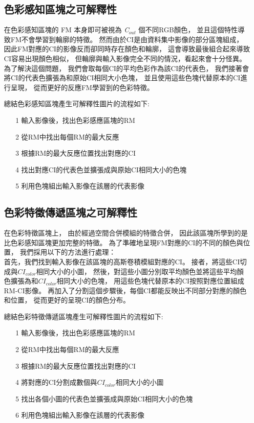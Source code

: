 \documentclass[class=NCU_thesis, crop=false]{standalone}
\begin{document}
	\subsection{色彩感知區塊之可解釋性}
	在色彩感知區塊的 FM 本身即可被視為 \textit{C}$_{out}$ 個不同RGB顏色，
	並且這個特性導致FM不會學習到輪廓的特徵。
	然而由於CI是由資料集中影像的部分區塊組成，
	因此FM對應的CI的影像反而卻同時存在顏色和輪廓，
	這會導致最後組合起來導致CI容易出現顏色相似，
	但輪廓與輸入影像完全不同的情況，看起來會十分怪異。
	為了解決這個問題，
	我們會取每個CI的平均色彩作為該CI的代表色，
	我們接著會將CI的代表色擴張為和原始CI相同大小色塊，
	並且使用這些色塊代替原本的CI進行呈現，
	從而更好的反應FM學習到的色彩特徵。

	總結色彩感知區塊產生可解釋性圖片的流程如下:
	\begin{itemize}
		\item [1]
		輸入影像後，找出色彩感應區塊的RM
		\item [2]
		從RM中找出每個RM的最大反應
		\item [3]
		根據RM的最大反應位置找出對應的CI
		\item [4]
		找出對應CI的代表色並擴張成與原始CI相同大小的色塊
		\item [5]
		利用色塊組出輸入影像在該層的代表影像
	\end{itemize}

	\subsection{色彩特徵傳遞區塊之可解釋性}
	在色彩特徵區塊上，
	由於經過空間合併模組的特徵合併，
	因此該區塊所學到的是比色彩感知區塊更加完整的特徵。
	為了準確地呈現FM對應的CI的不同的顏色與位置，
	我們採用以下的方法進行處理：\\
	首先，我們找到輸入影像在該區塊的高斯卷積模組對應的CI。
	接者，將這些CI切成與$CI_{color}$相同大小的小圖，
	然後，對這些小圖分別取平均顏色並將這些平均顏色擴張為和$CI_{color}$相同大小的色塊，
	用這些色塊代替原本的CI按照對應位置組成RM-CI影像。
	再加入了分割這個步驟後，每個CI都能反映出不同部分對應的顏色和位置，
	從而更好的呈現CI的顏色分布。

	總結色彩特徵傳遞區塊產生可解釋性圖片的流程如下:
	\begin{itemize}
		\item [1]
		輸入影像後，找出色彩感應區塊的RM
		\item [2]
		從RM中找出每個RM的最大反應
		\item [3]
		根據RM的最大反應位置找出對應的CI
		\item [4]
		將對應的CI分割成數個與$CI_{color}$相同大小的小圖
		\item [5]
		找出各個小圖的代表色並擴張成與原始CI相同大小的色塊
		\item [6]
		利用色塊組出輸入影像在該層的代表影像
	\end{itemize}
\end{document}
